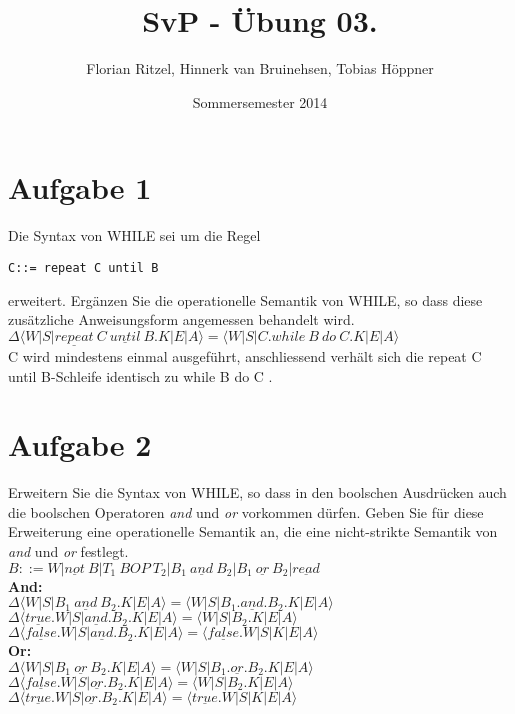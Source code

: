 \documentclass[ngerman,a4paper]{report}
\author{Florian Ritzel, Hinnerk van Bruinehsen, Tobias Höppner}
\title{SvP - Übung 03. }
\date{Sommersemester 2014}
\renewcommand{\maketitle}{}
\begin{document}
\maketitle
\section*{Aufgabe 1}
Die Syntax von WHILE sei um die Regel
\begin{lstlisting}
C::= repeat C until B
\end{lstlisting}
erweitert. Ergänzen Sie die operationelle Semantik von WHILE, so dass diese zusätzliche Anweisungsform angemessen behandelt wird.\\

$\Delta\langle W|S|\underline{repeat}\ C\ \underline{until}\ B.K|E|A\rangle = \langle W|S|C.while\ B\ do\ C.K|E|A\rangle$\\
C wird mindestens einmal ausgeführt, anschliessend verhält sich die \glqq repeat C until B\grqq -Schleife identisch zu \glqq while B do C \grqq .\\

\section*{Aufgabe 2}
Erweitern Sie die Syntax von WHILE, so dass in den boolschen Ausdrücken auch die boolschen Operatoren \textit{and} und \textit{or} vorkommen dürfen. Geben Sie für diese Erweiterung eine operationelle Semantik an, die eine nicht-strikte Semantik von \textit{and} und \textit{or} festlegt.\\

$B::=W| \underline{not}\ B| T_1\ BOP\ T_2| B_1\ \underline{and}\  B_2| B_1\ \underline{or}\ B_2| \underline{read}$\\

\textbf{And:}\\
$\Delta\langle W|S|B_1\ \underline{and}\ B_2.K|E|A\rangle = \langle W|S|B_1.\underline{and}.B_2.K|E|A\rangle$\\
$\Delta\langle \underline{true}.W|S|\underline{and}.B_2.K|E|A\rangle = \langle W|S|B_2.K|E|A\rangle$\\
$\Delta\langle \underline{false}.W|S|\underline{and}.B_2.K|E|A\rangle = \langle \underline{false}.W|S|K|E|A\rangle$\\

\textbf{Or:}\\
$\Delta\langle W|S|B_1\ \underline{or}\ B_2.K|E|A\rangle = \langle W|S|B_1.\underline{or}.B_2.K|E|A\rangle$\\
$\Delta\langle \underline{false}.W|S|\underline{or}.B_2.K|E|A\rangle = \langle W|S|B_2.K|E|A\rangle$\\
$\Delta\langle \underline{true}.W|S|\underline{or}.B_2.K|E|A\rangle = \langle \underline{true}.W|S|K|E|A\rangle$\\
\end{document}
